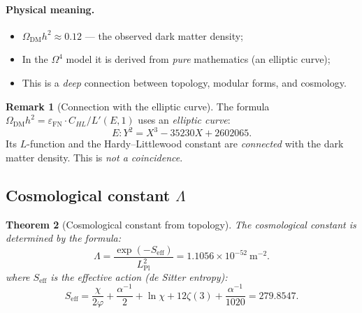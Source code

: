 \documentclass[11pt,a4paper]{article}
\newcommand{\Om}{\Omega^4}
\newcommand{\epsFN}{\varepsilon_{\text{FN}}}
\newtheorem{theorem}{Theorem}[section]
\theoremstyle{definition}
\newtheorem{remark}[theorem]{Remark}
\begin{document}
\paragraph{Physical meaning.}
\begin{itemize}
    \item $\Omega_{\text{DM}} h^2 \approx 0.12$ — 
          the observed dark matter density;
    \item In the $\Om$ model it is derived from \emph{pure} 
          mathematics (an elliptic curve);
    \item This is a \emph{deep} connection between topology, 
          modular forms, and cosmology.
\end{itemize}

\begin{remark}[Connection with the elliptic curve]
\label{rem:ec-dm}
The formula 
$\Omega_{\text{DM}} h^2 = \epsFN \cdot C_{HL} / L'(E, 1)$ 
uses an \emph{elliptic curve}:
\begin{equation}
    E: Y^2 = X^3 - 35230 X + 2602065.
\end{equation}
Its $L$-function and the Hardy--Littlewood constant are \emph{connected} 
with the dark matter density. This is \emph{not a coincidence}.
\end{remark}

\subsection{Cosmological constant $\Lambda$}
\label{subsec:lambda-cosmo}

\begin{theorem}[Cosmological constant from topology]
\label{thm:lambda-cosmo}
The cosmological constant is determined by the formula:
\begin{equation}
    \boxed{
    \Lambda = \frac{\exp(-S_{\text{eff}})}{L_{\text{Pl}}^2}
    = 1.1056 \times 10^{-52}~\text{m}^{-2}.
    }
    \label{eq:lambda-main}
\end{equation}
where $S_{\text{eff}}$ is the effective action (de Sitter 
entropy):
\begin{equation}
    S_{\text{eff}} = \frac{\chi}{2\varphi} + \frac{\alpha^{-1}}{2} 
    + \ln \chi + 12 \zeta(3) + \frac{\alpha^{-1}}{1020}
    = 279.8547.
\end{equation}
\end{theorem}
\end{document}
